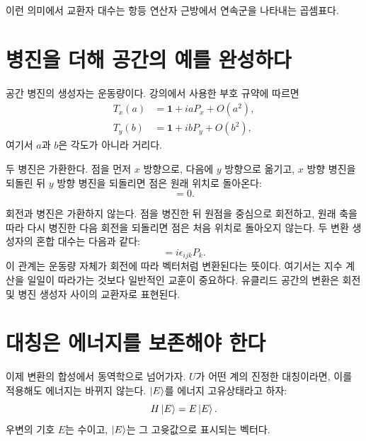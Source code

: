 이런 의미에서 교환자 대수는 항등 연산자 근방에서 연속군을 나타내는 곱셈표다.

\section{병진을 더해 공간의 예를 완성하다}

공간 병진의 생성자는 운동량이다. 강의에서 사용한 부호 규약에 따르면
\begin{equation}
\begin{aligned}
T_x(a)&=\mathbf 1+iaP_x+O(a^2),\\
T_y(b)&=\mathbf 1+ibP_y+O(b^2),
\end{aligned}
\end{equation}
여기서 \(a\)과 \(b\)은 각도가 아니라 거리다.

두 병진은 가환한다. 점을 먼저 \(x\) 방향으로, 다음에 \(y\) 방향으로 옮기고, \(x\) 방향 병진을 되돌린 뒤 \(y\) 방향 병진을 되돌리면 점은 원래 위치로 돌아온다:
\begin{equation}
[P_i,P_j]=0.
\end{equation}

\begin{classroomqa}
\end{classroomqa}

회전과 병진은 가환하지 않는다. 점을 병진한 뒤 원점을 중심으로 회전하고, 원래 축을 따라 다시 병진한 다음 회전을 되돌리면 점은 처음 위치로 돌아오지 않는다. 두 변환 생성자의 혼합 대수는 다음과 같다:
\begin{equation}
[L_i,P_j]=i\epsilon_{ijk}P_k.
\end{equation}
이 관계는 운동량 자체가 회전에 따라 벡터처럼 변환된다는 뜻이다. 여기서는 지수 계산을 일일이 따라가는 것보다 일반적인 교훈이 중요하다. 유클리드 공간의 변환은 회전 및 병진 생성자 사이의 교환자로 표현된다.

\section{대칭은 에너지를 보존해야 한다}

이제 변환의 합성에서 동역학으로 넘어가자. \(U\)가 어떤 계의 진정한 대칭이라면, 이를 적용해도 에너지는 바뀌지 않는다. \(\left\lvert E\right\rangle\)를 에너지 고유상태라고 하자:
\begin{equation}
H\left\lvert E\right\rangle=E\left\lvert E\right\rangle.
\end{equation}
우변의 기호 \(E\)는 수이고, \(\left\lvert E\right\rangle\)는 그 고윳값으로 표시되는 벡터다.

